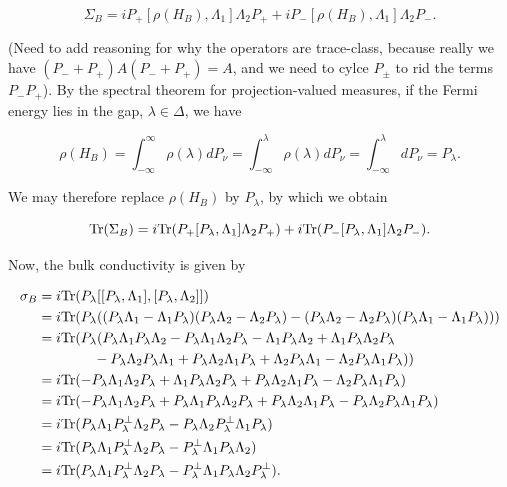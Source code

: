 \documentclass[12pt, letterpaper]{article}
\begin{document}
\[\Sigma_B = iP_+[\rho(H_B),\Lambda_1]\Lambda_2P_+ + iP_-[\rho(H_B),\Lambda_1]\Lambda_2P_-.\]

(Need to add reasoning for why the operators are trace-class, because really we have $(P_-+P_+)A(P_-+P_+)=A$, and we need to cylce $P_\pm$ to rid the terms $P_-P_+$). By the spectral theorem for projection-valued measures, if the Fermi energy lies in the gap, $\lambda \in \Delta$, we have

\[ \rho(H_B) = \int_{-\infty}^\infty \rho(\lambda) dP_\nu = \int_{-\infty}^\lambda \rho(\lambda) dP_\nu = \int_{-\infty}^\lambda dP_\nu = P_\lambda.\]

We may therefore replace $\rho(H_B)$ by $P_\lambda$, by which we obtain

\[\text{Tr}(\Sigma_B) = i\text{Tr}(P_+[P_\lambda,\Lambda_1]\Lambda_2P_+) + i\text{Tr}(P_-[P_\lambda,\Lambda_1]\Lambda_2P_-).\]

Now, the bulk conductivity is given by

\[\begin{aligned}
\sigma_B &= i\text{Tr}(P_\lambda [[P_\lambda, \Lambda_1],[P_\lambda,\Lambda_2]])\\
&= i\text{Tr}(P_\lambda ((P_\lambda \Lambda_1-\Lambda_1P_\lambda)(P_\lambda\Lambda_2 - \Lambda_2P_\lambda) - (P_\lambda\Lambda_2 - \Lambda_2P_\lambda)(P_\lambda\Lambda_1-\Lambda_1P_\lambda)))\\
&= i\text{Tr}(P_\lambda(P_\lambda\Lambda_1P_\lambda\Lambda_2 - P_\lambda\Lambda_1\Lambda_2 P_\lambda - \Lambda_1P_\lambda\Lambda_2 + \Lambda_1P_\lambda\Lambda_2P_\lambda \\
&\quad\quad\quad\quad - P_\lambda\Lambda_2P_\lambda\Lambda_1 + P_\lambda\Lambda_2\Lambda_1P_\lambda + \Lambda_2P_\lambda\Lambda_1 - \Lambda_2P_\lambda\Lambda_1P_\lambda))\\
&= i\text{Tr}(- P_\lambda\Lambda_1\Lambda_2 P_\lambda + \Lambda_1P_\lambda\Lambda_2P_\lambda + P_\lambda\Lambda_2\Lambda_1P_\lambda - \Lambda_2P_\lambda\Lambda_1P_\lambda)\\
&= i\text{Tr}(- P_\lambda\Lambda_1\Lambda_2 P_\lambda + P_\lambda\Lambda_1P_\lambda\Lambda_2P_\lambda + P_\lambda\Lambda_2\Lambda_1P_\lambda - P_\lambda\Lambda_2P_\lambda\Lambda_1P_\lambda)\\
&= i\text{Tr}(P_\lambda\Lambda_1 P_\lambda^\perp \Lambda_2P_\lambda - P_\lambda\Lambda_2 P_\lambda^\perp \Lambda_1 P_\lambda)\\
&= i\text{Tr}(P_\lambda\Lambda_1 P_\lambda^\perp \Lambda_2P_\lambda -  P_\lambda^\perp \Lambda_1 P_\lambda\Lambda_2)\\
&= i\text{Tr}(P_\lambda\Lambda_1 P_\lambda^\perp \Lambda_2P_\lambda -  P_\lambda^\perp \Lambda_1 P_\lambda\Lambda_2P_\lambda^\perp).
\end{aligned}\]
\end{document}
